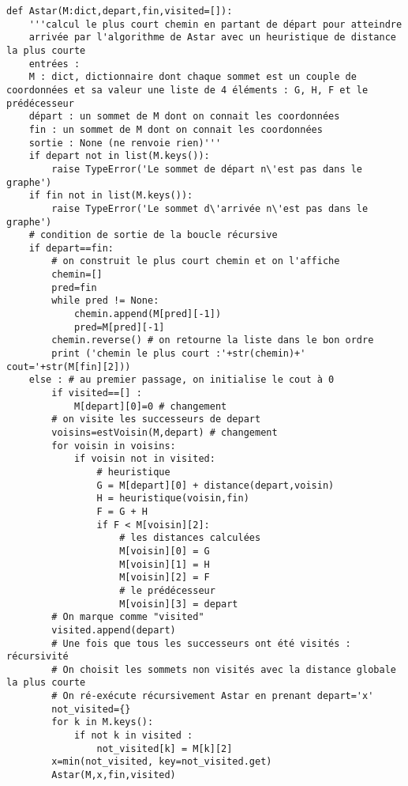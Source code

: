 \begin{lstlisting}
def Astar(M:dict,depart,fin,visited=[]):
    '''calcul le plus court chemin en partant de départ pour atteindre
    arrivée par l'algorithme de Astar avec un heuristique de distance la plus courte
    entrées :
    M : dict, dictionnaire dont chaque sommet est un couple de coordonnées et sa valeur une liste de 4 éléments : G, H, F et le prédécesseur
    départ : un sommet de M dont on connait les coordonnées
    fin : un sommet de M dont on connait les coordonnées
    sortie : None (ne renvoie rien)'''
    if depart not in list(M.keys()):
        raise TypeError('Le sommet de départ n\'est pas dans le graphe')
    if fin not in list(M.keys()):
        raise TypeError('Le sommet d\'arrivée n\'est pas dans le graphe')
    # condition de sortie de la boucle récursive
    if depart==fin:
        # on construit le plus court chemin et on l'affiche
        chemin=[]
        pred=fin
        while pred != None:
            chemin.append(M[pred][-1])
            pred=M[pred][-1]
        chemin.reverse() # on retourne la liste dans le bon ordre
        print ('chemin le plus court :'+str(chemin)+' cout='+str(M[fin][2]))
    else : # au premier passage, on initialise le cout à 0
        if visited==[] :
            M[depart][0]=0 # changement
        # on visite les successeurs de depart
        voisins=estVoisin(M,depart) # changement
        for voisin in voisins:
            if voisin not in visited:
                # heuristique
                G = M[depart][0] + distance(depart,voisin)
                H = heuristique(voisin,fin)
                F = G + H
                if F < M[voisin][2]:
                    # les distances calculées
                    M[voisin][0] = G
                    M[voisin][1] = H
                    M[voisin][2] = F
                    # le prédécesseur
                    M[voisin][3] = depart
        # On marque comme "visited"
        visited.append(depart)
        # Une fois que tous les successeurs ont été visités : récursivité
        # On choisit les sommets non visités avec la distance globale la plus courte
        # On ré-exécute récursivement Astar en prenant depart='x'
        not_visited={}
        for k in M.keys():
            if not k in visited :
                not_visited[k] = M[k][2]
        x=min(not_visited, key=not_visited.get)
        Astar(M,x,fin,visited)


\end{lstlisting}


